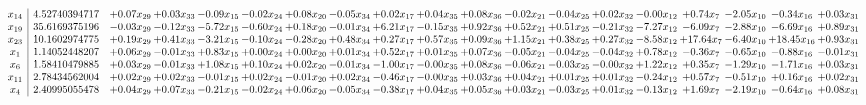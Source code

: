 \documentclass[9pt]{article}
\begin{document}
 \[\begin{array}{c| c c@{\hskip 2pt} c@{\hskip 2pt} c@{\hskip 2pt} c@{\hskip 2pt} c@{\hskip 2pt} c@{\hskip 2pt} c@{\hskip 2pt} c@{\hskip 2pt} c@{\hskip 2pt} c@{\hskip 2pt} c@{\hskip 2pt} c@{\hskip 2pt} c@{\hskip 2pt} c@{\hskip 2pt} c@{\hskip 2pt} c@{\hskip 2pt} c@{\hskip 2pt} }
 x_{14}   &  4.52740394717 & +  0.07 x_{29} & +  0.03 x_{33} & -0.09 x_{15} & -0.02 x_{24} & +  0.08 x_{20} & -0.05 x_{34} & +  0.02 x_{17} & +  0.04 x_{35} & +  0.08 x_{36} & -0.02 x_{21} & -0.04 x_{25} & +  0.02 x_{32} & -0.00 x_{12} & +  0.74 x_{7} & -2.05 x_{10} & -0.34 x_{16} & +  0.03 x_{31}\\
 x_{19}   &  35.6169375196 & -0.03 x_{29} & -0.12 x_{33} & -5.72 x_{15} & -0.60 x_{24} & +  0.18 x_{20} & -0.01 x_{34} & +  6.21 x_{17} & -0.15 x_{35} & +  0.92 x_{36} & +  0.52 x_{21} & +  0.51 x_{25} & -0.21 x_{32} & -7.27 x_{12} & -6.09 x_{7} & -2.88 x_{10} & -6.69 x_{16} & +  0.89 x_{31}\\
 x_{23}   &  10.1602974775 & +  0.19 x_{29} & +  0.41 x_{33} & -3.21 x_{15} & -0.10 x_{24} & -0.28 x_{20} & +  0.48 x_{34} & +  0.27 x_{17} & +  0.57 x_{35} & +  0.09 x_{36} & +  1.15 x_{21} & +  0.38 x_{25} & +  0.27 x_{32} & -8.58 x_{12} & + 17.64 x_{7} & -6.40 x_{10} & + 18.45 x_{16} & +  0.93 x_{31}\\
 x_{1}   &  1.14052448207 & +  0.06 x_{29} & -0.01 x_{33} & +  0.83 x_{15} & +  0.00 x_{24} & +  0.00 x_{20} & +  0.01 x_{34} & +  0.52 x_{17} & +  0.01 x_{35} & +  0.07 x_{36} & -0.05 x_{21} & -0.04 x_{25} & -0.04 x_{32} & +  0.78 x_{12} & -0.36 x_{7} & -0.65 x_{10} & -0.88 x_{16} & -0.01 x_{31}\\
 x_{6}   &  1.58410479885 & +  0.03 x_{29} & -0.01 x_{33} & +  1.08 x_{15} & +  0.10 x_{24} & +  0.02 x_{20} & -0.01 x_{34} & -1.00 x_{17} & -0.00 x_{35} & +  0.08 x_{36} & -0.06 x_{21} & -0.03 x_{25} & -0.00 x_{32} & +  1.22 x_{12} & +  0.35 x_{7} & -1.29 x_{10} & -1.71 x_{16} & +  0.03 x_{31}\\
 x_{11}   &  2.78434562004 & +  0.02 x_{29} & +  0.02 x_{33} & -0.01 x_{15} & +  0.02 x_{24} & -0.01 x_{20} & +  0.02 x_{34} & -0.46 x_{17} & -0.00 x_{35} & +  0.03 x_{36} & +  0.04 x_{21} & +  0.01 x_{25} & +  0.01 x_{32} & -0.24 x_{12} & +  0.57 x_{7} & -0.51 x_{10} & +  0.16 x_{16} & +  0.02 x_{31}\\
 x_{4}   &  2.40995055478 & +  0.04 x_{29} & +  0.07 x_{33} & -0.21 x_{15} & -0.02 x_{24} & +  0.06 x_{20} & -0.05 x_{34} & -0.38 x_{17} & +  0.04 x_{35} & +  0.05 x_{36} & +  0.03 x_{21} & -0.03 x_{25} & +  0.01 x_{32} & -0.13 x_{12} & +  1.69 x_{7} & -2.19 x_{10} & -0.64 x_{16} & +  0.08 x_{31}\\

\end{array}\]
\end{document}

